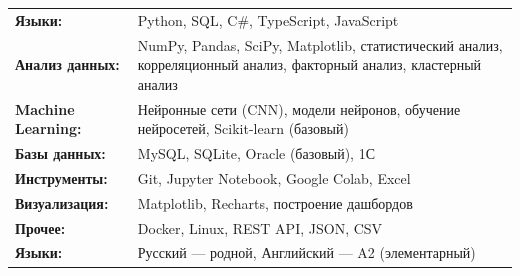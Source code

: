 \documentclass[10pt,a4paper]{article}
\begin{document}
\begin{tabular}{p{3.5cm} p{12cm}}
    \textbf{Языки:} & Python, SQL, C\#, TypeScript, JavaScript \\
    \textbf{Анализ данных:} & NumPy, Pandas, SciPy, Matplotlib, статистический анализ, корреляционный анализ, факторный анализ, кластерный анализ \\
    \textbf{Machine Learning:} & Нейронные сети (CNN), модели нейронов, обучение нейросетей, Scikit-learn (базовый) \\
    \textbf{Базы данных:} & MySQL, SQLite, Oracle (базовый), 1С \\
    \textbf{Инструменты:} & Git, Jupyter Notebook, Google Colab, Excel \\
    \textbf{Визуализация:} & Matplotlib, Recharts, построение дашбордов \\
    \textbf{Прочее:} & Docker, Linux, REST API, JSON, CSV \\
    \textbf{Языки:} & Русский — родной, Английский — A2 (элементарный)
\end{tabular}

\end{document}
